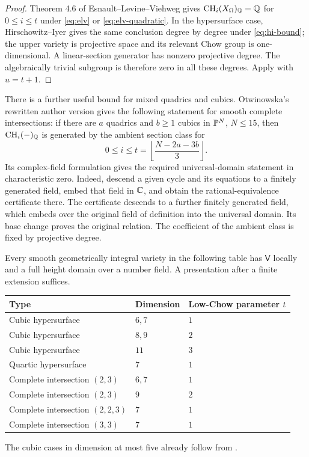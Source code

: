 \begin{proof}
Theorem 4.6 of Esnault--Levine--Viehweg \cite{ELV} gives
$\operatorname{CH}_i(X_\Omega)_\mathbb Q=\mathbb Q$ for $0\leq i\leq t$ under
\eqref{eq:elv} or \eqref{eq:elv-quadratic}. In the hypersurface
case, Hirschowitz--Iyer \cite[Theorem 1.5]{HI} gives the same
conclusion degree by degree under \eqref{eq:hi-bound}; the upper
variety is projective space and its relevant Chow group is
one-dimensional. A linear-section generator has nonzero projective
degree. The algebraically trivial subgroup is therefore zero in
all these degrees. Apply  with $u=t+1$.
\end{proof}

There is a further useful bound for mixed quadrics and cubics.
Otwinowska's rewritten author version \cite[Corollaire 1]{Otwinowska}
gives the following statement for smooth complete intersections:
if there are $a$ quadrics and $b\geq1$ cubics in $\mathbb P^N$, $N\leq15$,
then $\operatorname{CH}_i(-)_\mathbb Q$ is generated by the ambient section class for
\begin{equation}\label{eq:ot-bound}
 0\leq i\leq t=\left\lfloor\frac{N-2a-3b}{3}\right\rfloor.
\end{equation}
Its complex-field formulation gives the required universal-domain
statement in characteristic zero. Indeed, descend a given cycle
and its equations to a finitely generated field, embed that field
in $\mathbb C$, and obtain the rational-equivalence certificate there.
The certificate descends to a further finitely generated field,
which embeds over the original field of definition into the
universal domain. Its base change proves the original relation.
The coefficient of the ambient class is fixed by projective degree.

\begin{corollary}\label{cor:ci-list}
Every smooth geometrically integral variety in the following table
has $\mathsf V$ locally and a full height domain over a number
field. A presentation after a finite extension suffices.
\begin{center}
\begin{tabular}{lll}
\toprule
Type & Dimension & Low-Chow parameter $t$\\
\midrule
Cubic hypersurface & $6,7$ & $1$\\
Cubic hypersurface & $8,9$ & $2$\\
Cubic hypersurface & $11$ & $3$\\
Quartic hypersurface & $7$ & $1$\\
Complete intersection $(2,3)$ & $6,7$ & $1$\\
Complete intersection $(2,3)$ & $9$ & $2$\\
Complete intersection $(2,2,3)$ & $7$ & $1$\\
Complete intersection $(3,3)$ & $7$ & $1$\\
\bottomrule
\end{tabular}
\end{center}
The cubic cases in dimension at most five already follow from
.
\end{corollary}

